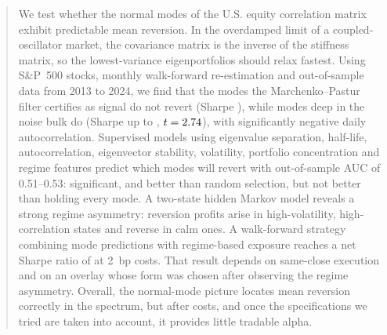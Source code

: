 \begin{abstract}
\noindent
We test whether the normal modes of the U.S. equity correlation matrix
exhibit predictable mean reversion. In the overdamped limit of a
coupled-oscillator market, the covariance matrix is the inverse of the
stiffness matrix, so the lowest-variance eigenportfolios should relax
fastest. Using \DataAssets{} S\&P~500 stocks, monthly walk-forward
re-estimation and out-of-sample data from 2013 to 2024, we find that the
modes the Marchenko--Pastur filter certifies as signal do not revert
(Sharpe \SRSignalLevel), while modes deep in the noise bulk do (Sharpe
up to \SRMiddleLevel, $t=\TMiddleLevel$), with significantly negative
daily autocorrelation. Supervised models using eigenvalue separation,
half-life, autocorrelation, eigenvector stability, volatility,
portfolio concentration and regime features predict which modes will
revert with out-of-sample AUC of 0.51--0.53: significant, and better
than random selection, but not better than holding every mode. A
two-state hidden Markov model reveals a strong regime asymmetry:
reversion profits arise in high-volatility, high-correlation states and
reverse in calm ones. A walk-forward strategy combining mode
predictions with regime-based exposure reaches a net Sharpe ratio of
\SRMLOverB{} at 2~bp costs. That result depends on same-close execution
and on an overlay whose form was chosen after observing the regime
asymmetry. Overall, the normal-mode picture locates mean reversion
correctly in the spectrum, but after costs, and once the specifications
we tried are taken into account, it provides little tradable alpha.
\end{abstract}
